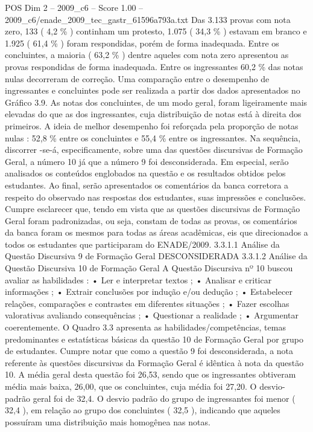 \begin{textsample}{POS Dim 2 – 2009\_c6 – Score 1.00 – 2009\_c6/enade\_2009\_tec\_gastr\_61596a793a.txt}
Das 3.133 provas com nota zero, 133 ( 4,2 \% ) continham um protesto, 1.075 ( 34,3 \% ) estavam em branco e 1.925 ( 61,4 \% ) foram respondidas, porém de forma inadequada.
Entre os concluintes, a maioria ( 63,2 \% ) dentre aqueles com nota zero apresentou as provas respondidas de forma inadequada.
Entre os ingressantes 60,2 \% das notas nulas decorreram de correção.
Uma comparação entre o desempenho de ingressantes e concluintes pode ser realizada a partir dos dados apresentados no Gráfico 3.9.
As notas dos concluintes, de um modo geral, foram ligeiramente mais elevadas do que as dos ingressantes, cuja distribuição de notas está à direita dos primeiros.
A ideia de melhor desempenho foi reforçada pela proporção de notas nulas : 52,8 \% entre os concluintes e 55,4 \% entre os ingressantes.
Na sequência, discorrer -se-á, especificamente, sobre uma das questões discursivas de Formação Geral, a número 10 já que a número 9 foi desconsiderada.
Em especial, serão analisados os conteúdos englobados na questão e os resultados obtidos pelos estudantes.
Ao final, serão apresentados os comentários da banca corretora a respeito do observado nas respostas dos estudantes, suas impressões e conclusões.
Cumpre esclarecer que, tendo em vista que as questões discursivas de Formação Geral foram padronizadas, ou seja, constam de todas as provas, os comentários da banca foram os mesmos para todas as áreas acadêmicas, eis que direcionados a todos os estudantes que participaram do ENADE/2009. 3.3.1.1 Análise da Questão Discursiva 9 de Formação Geral DESCONSIDERADA 3.3.1.2 Análise da Questão Discursiva 10 de Formação Geral A Questão Discursiva nº 10 buscou avaliar as habilidades : • Ler e interpretar textos ; • Analisar e criticar informações ; • Extrair conclusões por indução e/ou dedução ; • Estabelecer relações, comparações e contrastes em diferentes situações ; • Fazer escolhas valorativas avaliando consequências ; • Questionar a realidade ; • Argumentar coerentemente.
O Quadro 3.3 apresenta as habilidades/competências, temas predominantes e estatísticas básicas da questão 10 de Formação Geral por grupo de estudantes.
Cumpre notar que como a questão 9 foi desconsiderada, a nota referente às questões discursivas da Formação Geral é idêntica à nota da questão 10.
A média geral desta questão foi 26,53, sendo que os ingressantes obtiveram média mais baixa, 26,00, que os concluintes, cuja média foi 27,20.
O desvio-padrão geral foi de 32,4.
O desvio padrão do grupo de ingressantes foi menor ( 32,4 ), em relação ao grupo dos concluintes ( 32,5 ), indicando que aqueles possuíram uma distribuição mais homogênea nas notas.

\end{textsample}
